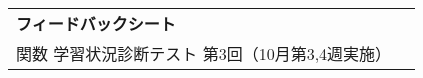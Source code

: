 \begin{table}[h]
    \begin{tabularx}{0.9\linewidth}{ll}
        \textbf{\Large フィードバックシート} & \\
        関数 学習状況診断テスト 第3回（10月第3,4週実施）&
    \end{tabularx}
\end{table}
